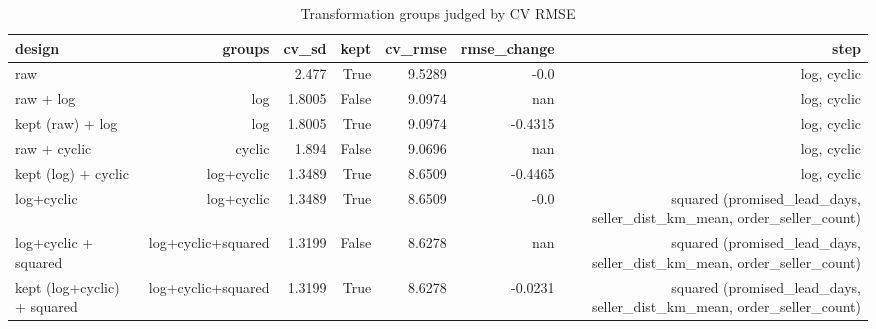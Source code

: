 \begin{table}[htbp]
\centering
\small
\caption{Transformation groups judged by CV RMSE}
\begin{tabular}{lrrrrrr}
\toprule
design & groups & cv\_sd & kept & cv\_rmse & rmse\_change & step \\
\midrule
raw &  & 2.477 & True & 9.5289 & -0.0 & log, cyclic \\
raw + log & log & 1.8005 & False & 9.0974 & nan & log, cyclic \\
kept (raw) + log & log & 1.8005 & True & 9.0974 & -0.4315 & log, cyclic \\
raw + cyclic & cyclic & 1.894 & False & 9.0696 & nan & log, cyclic \\
kept (log) + cyclic & log+cyclic & 1.3489 & True & 8.6509 & -0.4465 & log, cyclic \\
log+cyclic & log+cyclic & 1.3489 & True & 8.6509 & -0.0 & squared (promised\_lead\_days, seller\_dist\_km\_mean, order\_seller\_count) \\
log+cyclic + squared & log+cyclic+squared & 1.3199 & False & 8.6278 & nan & squared (promised\_lead\_days, seller\_dist\_km\_mean, order\_seller\_count) \\
kept (log+cyclic) + squared & log+cyclic+squared & 1.3199 & True & 8.6278 & -0.0231 & squared (promised\_lead\_days, seller\_dist\_km\_mean, order\_seller\_count) \\
\bottomrule
\end{tabular}
\par\smallskip\begin{minipage}{\linewidth}\footnotesize \end{minipage}
\end{table}


